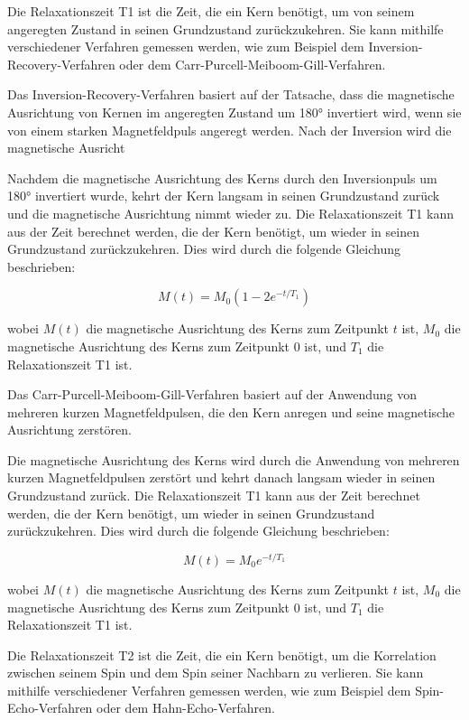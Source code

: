 Die Relaxationszeit T1 ist die Zeit, die ein Kern benötigt, 
um von seinem angeregten Zustand in seinen Grundzustand 
zurückzukehren. Sie kann mithilfe verschiedener Verfahren 
gemessen werden, wie zum Beispiel dem 
Inversion-Recovery-Verfahren oder dem Carr-Purcell-Meiboom-Gill-Verfahren.

Das Inversion-Recovery-Verfahren basiert auf der Tatsache, 
dass die magnetische Ausrichtung von Kernen im angeregten 
Zustand um 180° invertiert wird, wenn sie von einem starken
 Magnetfeldpuls angeregt werden. Nach der Inversion wird 
 die magnetische Ausricht



Nachdem die magnetische Ausrichtung des Kerns durch den
 Inversionpuls um 180° invertiert wurde, kehrt der Kern 
 langsam in seinen Grundzustand zurück und die magnetische 
 Ausrichtung nimmt wieder zu. Die Relaxationszeit T1 
 kann aus der Zeit berechnet werden, die der Kern 
 benötigt, um wieder in seinen Grundzustand 
 zurückzukehren. Dies wird durch die folgende 
 Gleichung beschrieben:

\begin{equation}
M(t) = M_0 \left( 1 - 2e^{-t/T_1} \right)
\end{equation}

wobei $M(t)$ die magnetische Ausrichtung des Kerns zum 
Zeitpunkt $t$ ist, $M_0$ die magnetische Ausrichtung 
des Kerns zum Zeitpunkt 0 ist, und $T_1$ die 
Relaxationszeit T1 ist.

Das Carr-Purcell-Meiboom-Gill-Verfahren basiert auf 
der Anwendung von mehreren kurzen Magnetfeldpulsen, 
die den Kern anregen und seine magnetische 
Ausrichtung zerstören.



Die magnetische Ausrichtung des Kerns wird durch die 
Anwendung von mehreren kurzen Magnetfeldpulsen 
zerstört und kehrt danach langsam wieder in seinen 
Grundzustand zurück. Die Relaxationszeit T1 kann aus 
der Zeit berechnet werden, die der Kern benötigt, 
um wieder in seinen Grundzustand zurückzukehren. 
Dies wird durch die folgende Gleichung beschrieben:

\begin{equation}
M(t) = M_0 e^{-t/T_1}
\end{equation}

wobei $M(t)$ die magnetische Ausrichtung des Kerns
zum Zeitpunkt $t$ ist, $M_0$ die magnetische 
Ausrichtung des Kerns zum Zeitpunkt 0 ist, und $T_1$ 
die Relaxationszeit T1 ist.

Die Relaxationszeit T2 ist die Zeit, die ein Kern 
benötigt, um die Korrelation zwischen seinem Spin 
und dem Spin seiner Nachbarn zu verlieren. Sie kann 
mithilfe verschiedener Verfahren gemessen werden, 
wie zum Beispiel dem Spin-Echo-Verfahren oder dem Hahn-Echo-Verfahren.

